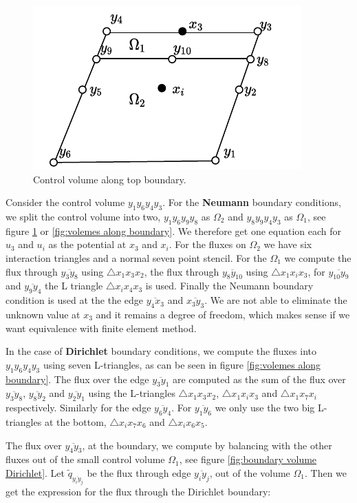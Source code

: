 \documentclass[../Main/main.tex]{subfiles}
\begin{document}
	\begin{figure}
		\centering
		\includegraphics{volumepartition.pdf}
		\caption{Control volume along top boundary.}
		\label{fig:volumepartition}
	\end{figure}
	Consider the control volume $y_1 y_6 y_4 y_3$. 
	For the \textbf{Neumann} boundary conditions, we split the control volume into two, $y_1 y_6 y_9 y_8$ as $\Omega_2$ and $y_8 y_9 y_4 y_3$ as  $\Omega_1$, see figure \ref{fig:volumepartition} or \ref{fig:volemes along boundary}. We therefore get one  equation each for $u_3$ and $u_i$ as the potential at $x_3$ and $x_i$. For the fluxes on $\Omega_2$ we have six interaction triangles and a normal seven point stencil. For the $\Omega_1$ we compute the flux through $\overline{y_3 y_8}$ using $\triangle x_1 x_3 x_2$, the flux through $\overline{y_8 y_{10}}$ using $\triangle x_1 x_i x_3$, for $\overline{y_{10}y_9}$ and $\overline{y_9 y_4}$ the L triangle  $\triangle x_i x_4 x_3$ is used. Finally the Neumann boundary condition is used at the the edge $\overline{y_4 x_3}$ and $\overline{x_3 y_3}$. We are not able to eliminate the unknown value at $x_3$ and it remains a degree of freedom, which makes sense if we want equivalence with finite element method.
	\par
	In the case of \textbf{Dirichlet} boundary conditions, we compute the fluxes into $y_1 y_6 y_4 y_3$ using seven L-triangles, as can be seen in figure \ref{fig:volemes along boundary}. The flux over the edge $\overline{y_3 y_1}$ are computed as the sum of the flux over $\overline{y_3 y_8}$, $\overline{y_8 y_2}$ and $\overline{y_2 y_1}$ using the L-triangles $\triangle x_1 x_3 x_2$, $\triangle x_1 x_i x_3$ and $\triangle x_1 x_7 x_i$ respectively. Similarly for the edge $\overline{y_6 y_4}$. For $\overline{y_1 y_6}$ we only use the two big L-triangles at the bottom, $\triangle x_i x_7 x_6$ and $\triangle x_i x_6 x_5$. 
	\par 
	The flux over $\overline{y_4 y_3}$, at the boundary, we compute by balancing with the other fluxes out of the small control volume $\Omega_1$, see figure \ref{fig:boundary volume Dirichlet}. Let $	\tilde{q}_{\overline{y_i y_j}}$ be the flux through edge $\overline{y_i y_j}$, out of the volume $\Omega_1$. Then we get the expression for the flux through the Dirichlet boundary:
\end{document}
